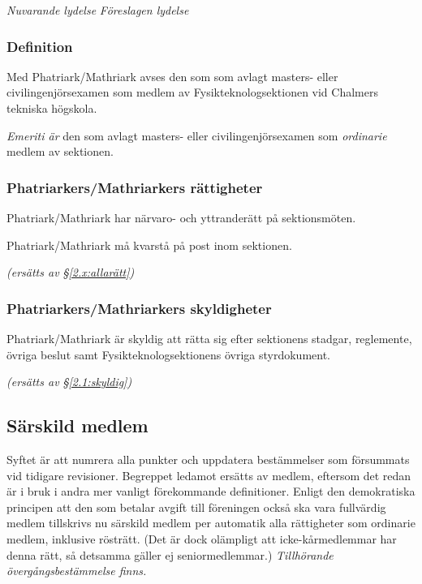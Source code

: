 \documentclass{article}
\newenvironment{lydelse}
    {\begin{paracol}{2}%
        \emph{Nuvarande lydelse}%
        \switchcolumn%
        \emph{Föreslagen lydelse}%
    \end{paracol}%
    \begin{enumerate}[label=\thesubsection.\arabic*]%
    \begin{paracol}{2}%
    }{\end{paracol}\end{enumerate}}
\newcommand{\itemb}{\item[\textbullet]}
\begin{document}
\begin{lydelse}%
  \subsubsection*{Definition}
    \itemb Med Phatriark/Mathriark avses den som som avlagt masters- eller civil\-ingenjörs\-examen som medlem av Fysik\-teknolog\-sektionen vid Ch\-al\-mers tekniska högskola.

  \switchcolumn
  \setcounter{enumi}{0}
    \item \emph{Emeriti är} den som avlagt masters- eller civilingenjörsexamen som \emph{ordinarie} medlem av sektionen.
    
  \switchcolumn*
    \subsubsection*{Phatriarkers/Mathriarkers rättigheter}%
    \itemb Phatriark/Mathriark har närvaro- och yttranderätt på sektionsmöten.

    \itemb Phatriark/Mathriark må kvarstå på post inom sektionen.
    
  \switchcolumn
    \emph{(ersätts av \S \ref{2.x:allarätt})}

  \switchcolumn*
    \subsubsection*{Phatriarkers/Mathriarkers skyldigheter}%
    \itemb Phatriark/Mathriark är skyldig att rätta sig efter sektionens stadgar, reglemente, övriga beslut samt Fysikteknologsektionens övriga styrdokument.
    
  \switchcolumn
    \emph{(ersätts av \S \ref{2.1:skyldig})}
\end{lydelse}

\subsection{Särskild medlem}
Syftet är att numrera alla punkter och uppdatera bestämmelser som försummats vid tidigare revisioner.
Begreppet ledamot ersätts av medlem, eftersom det redan är i bruk i andra mer vanligt förekommande definitioner.
Enligt den demokratiska principen att den som betalar avgift till föreningen också ska vara fullvärdig medlem tillskrivs nu särskild medlem per automatik alla rättigheter som ordinarie medlem, inklusive rösträtt.
(Det är dock olämpligt att icke-kårmedlemmar har denna rätt, så detsamma gäller ej seniormedlemmar.)
\emph{Tillhörande övergångsbestämmelse finns.}
\end{document}

